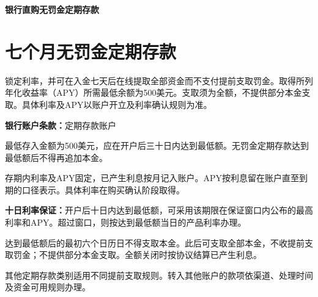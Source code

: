 \documentclass[UTF8,fontset=none,11pt,a4paper]{ctexart}
\begin{document}
{\noindent\fontsize{20}{25}\selectfont\bfseries 银行直购无罚金定期存款\par}
\vspace{10pt}
\section*{七个月无罚金定期存款}
锁定利率，并可在入金七天后在线提取全部资金而不支付提前支取罚金。取得所列年化收益率（APY）所需最低余额为500美元。支取须为全额，不提供部分本金支取。具体利率及APY以账户开立及利率确认规\allowbreak\mbox{则为准。}


\textbf{银行账户条款：}定期\allowbreak\mbox{存款账户}


最低存入金额为500美元，应在开户后三十日内达到最低额。无罚金定期存款达到最低额后不得再\allowbreak\mbox{追加本金。}


存期内利率及APY固定，已产生利息按月记入账户。APY按利息留在账户直至到期的口径表示。具体利率在购买确认\allowbreak\mbox{阶段取得。}


\textbf{十日利率保证：}开户后十日内达到最低额，可采用该期限在保证窗口内公布的最高利率和APY。超过窗口，则按达到最低额当日的产品\allowbreak\mbox{利率办理。}


达到最低额后的最初六个日历日不得支取本金。此后可支取全部本金，不收提前支取罚金；不提供部分本金支取。全额关闭时按协议结算已\allowbreak\mbox{产生利息。}


其他定期存款类别适用不同提前支取规则。转入其他账户的款项依渠道、处理时间及资金可用\allowbreak\mbox{规则办理。}
\end{document}
